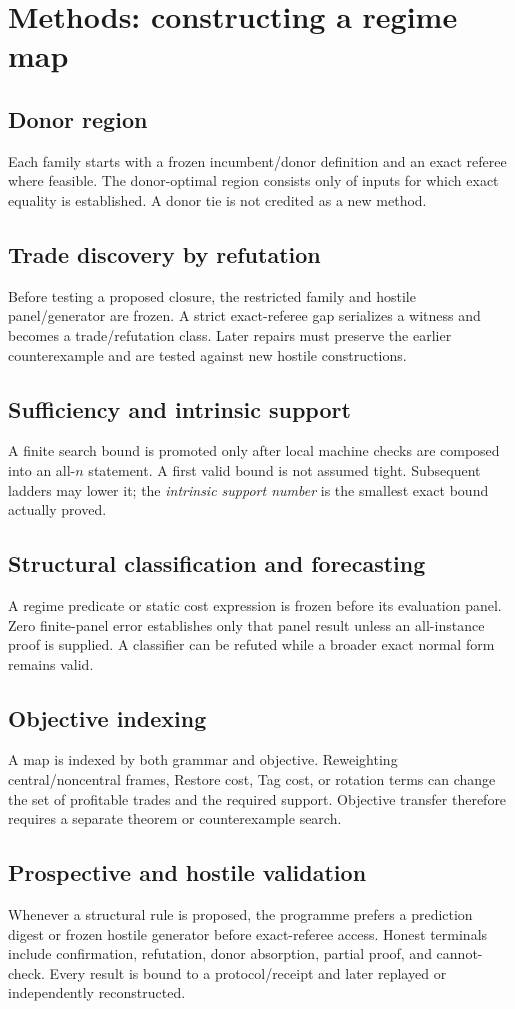 \section{Methods: constructing a regime map}

\subsection{Donor region}
Each family starts with a frozen incumbent/donor definition and an exact referee where feasible. The donor-optimal region consists only of inputs for which exact equality is established. A donor tie is not credited as a new method.

\subsection{Trade discovery by refutation}
Before testing a proposed closure, the restricted family and hostile panel/generator are frozen. A strict exact-referee gap serializes a witness and becomes a trade/refutation class. Later repairs must preserve the earlier counterexample and are tested against new hostile constructions.

\subsection{Sufficiency and intrinsic support}
A finite search bound is promoted only after local machine checks are composed into an all-$n$ statement. A first valid bound is not assumed tight. Subsequent ladders may lower it; the \emph{intrinsic support number} is the smallest exact bound actually proved.

\subsection{Structural classification and forecasting}
A regime predicate or static cost expression is frozen before its evaluation panel. Zero finite-panel error establishes only that panel result unless an all-instance proof is supplied. A classifier can be refuted while a broader exact normal form remains valid.

\subsection{Objective indexing}
A map is indexed by both grammar and objective. Reweighting central/noncentral frames, Restore cost, Tag cost, or rotation terms can change the set of profitable trades and the required support. Objective transfer therefore requires a separate theorem or counterexample search.

\subsection{Prospective and hostile validation}
Whenever a structural rule is proposed, the programme prefers a prediction digest or frozen hostile generator before exact-referee access. Honest terminals include confirmation, refutation, donor absorption, partial proof, and cannot-check. Every result is bound to a protocol/receipt and later replayed or independently reconstructed.